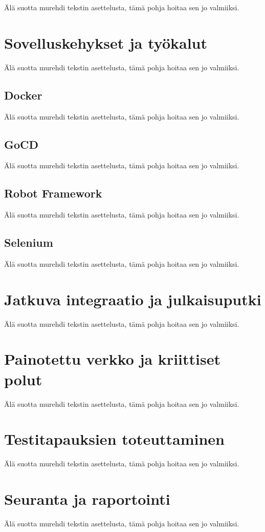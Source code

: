 Älä suotta murehdi tekstin asettelusta, tämä pohja hoitaa sen jo valmiiksi.

\section{Sovelluskehykset ja työkalut}

Älä suotta murehdi tekstin asettelusta, tämä pohja hoitaa sen jo valmiiksi.

\subsection{Docker}

Älä suotta murehdi tekstin asettelusta, tämä pohja hoitaa sen jo valmiiksi.

\subsection{GoCD}

Älä suotta murehdi tekstin asettelusta, tämä pohja hoitaa sen jo valmiiksi.

\subsection{Robot Framework}

Älä suotta murehdi tekstin asettelusta, tämä pohja hoitaa sen jo valmiiksi.

\subsection{Selenium}

Älä suotta murehdi tekstin asettelusta, tämä pohja hoitaa sen jo valmiiksi.

\section{Jatkuva integraatio ja julkaisuputki}

Älä suotta murehdi tekstin asettelusta, tämä pohja hoitaa sen jo valmiiksi.

\section{Painotettu verkko ja kriittiset polut}

Älä suotta murehdi tekstin asettelusta, tämä pohja hoitaa sen jo valmiiksi.

\section{Testitapauksien toteuttaminen}

Älä suotta murehdi tekstin asettelusta, tämä pohja hoitaa sen jo valmiiksi.

\section{Seuranta ja raportointi}

Älä suotta murehdi tekstin asettelusta, tämä pohja hoitaa sen jo valmiiksi.
